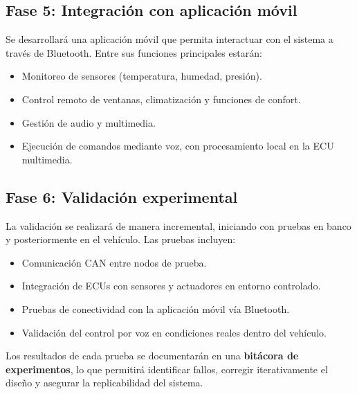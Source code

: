 \subsection{Fase 5: Integración con aplicación móvil}

Se desarrollará una aplicación móvil que permita interactuar con el sistema a través de Bluetooth. Entre sus funciones principales estarán:

\begin{itemize}
    \item Monitoreo de sensores (temperatura, humedad, presión).
    \item Control remoto de ventanas, climatización y funciones de confort.
    \item Gestión de audio y multimedia.
    \item Ejecución de comandos mediante voz, con procesamiento local en la ECU multimedia.
\end{itemize}

\subsection{Fase 6: Validación experimental}

La validación se realizará de manera incremental, iniciando con pruebas en banco y posteriormente en el vehículo. Las pruebas incluyen:

\begin{itemize}
    \item Comunicación CAN entre nodos de prueba.
    \item Integración de ECUs con sensores y actuadores en entorno controlado.
    \item Pruebas de conectividad con la aplicación móvil vía Bluetooth.
    \item Validación del control por voz en condiciones reales dentro del vehículo.
\end{itemize}

Los resultados de cada prueba se documentarán en una \textbf{bitácora de experimentos}, lo que permitirá identificar fallos, corregir iterativamente el diseño y asegurar la replicabilidad del sistema.

